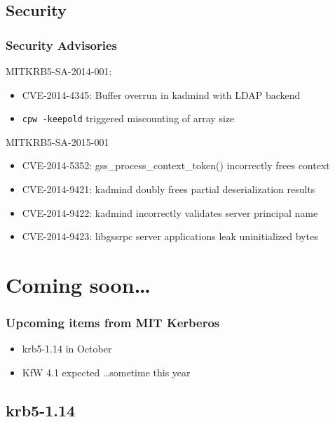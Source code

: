 \documentclass{beamer}
\begin{document}
\subsection{Security}

\begin{frame}[fragile]
\frametitle{Security Advisories}
MITKRB5-SA-2014-001:
\begin{itemize}
\item{CVE-2014-4345: Buffer overrun in kadmind with LDAP backend}
\item{\verb+cpw -keepold+ triggered miscounting of array size}
\end{itemize}
\pause
MITKRB5-SA-2015-001
\begin{itemize}
\item{CVE-2014-5352: gss\_process\_context\_token() incorrectly frees context}
\pause
\item{CVE-2014-9421: kadmind doubly frees partial deserialization results}
\pause
\item{CVE-2014-9422: kadmind incorrectly validates server principal name}
\pause
\item{CVE-2014-9423: libgssrpc server applications leak uninitialized bytes}
\end{itemize}
\end{frame}

\section{Coming soon\ldots{}}

\begin{frame}
\frametitle{Upcoming items from MIT Kerberos}
\begin{itemize}
\item{krb5-1.14 in October}
\item{KfW 4.1 expected \ldots sometime this year}
\end{itemize}
\end{frame}

\subsection{krb5-1.14}
\end{document}
